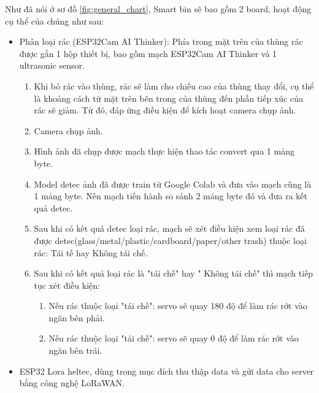 Như đã nói ở sơ đồ \ref{fig:general_chart}, Smart bin sẽ bao gồm 2 board, hoạt động cụ thể của chúng như sau:
\begin{itemize}
    \item Phân loại rác (ESP32Cam AI Thinker): Phía trong mặt trên của thùng rác được gắn 1 hộp thiết bị, bao gồm mạch ESP32Cam AI Thinker và 1 ultrasonic sensor.
    \begin{enumerate}
        \item Khi bỏ rác vào thùng, rác sẽ làm cho chiều cao của thùng thay đổi, cụ thể là khoảng cách từ mặt trên bên trong của thùng đến phần tiếp xúc của rác sẽ giảm. Từ đó, đáp ứng điều kiện để kích hoạt camera chụp ảnh.
        \item Camera chụp ảnh.
        \item Hình ảnh đã chụp được mạch thực hiện thao tác convert qua 1 mảng byte.
        \item Model detec ảnh đã được train từ Google Colab và đưa vào mạch cũng là 1 mảng byte. Nên mạch tiến hành so sánh 2 mảng byte đó và đưa ra kết quả detec.
        \item Sau khi có kết quả detec loại rác, mạch sẽ xét điều kiện xem loại rác đã được detec(glass/metal/plastic/cardboard/paper/other trash) thuộc loại rác: Tái tế hay Không tái chế.
        \item Sau khi có kết quả loại rác là "tái chế" hay " Không tái chế" thì mạch tiếp tục xét điều kiện:
        \begin{enumerate}
            \item Nếu rác thuộc loại "tái chế": servo sẽ quay 180 độ để làm rác rớt vào ngăn bên phải.
            \item Nếu rác thuộc loại "tái chế": servo sẽ quay 0 độ để làm rác rớt vào ngăn bên trái.
        \end{enumerate} 
    \end{enumerate}
    \item ESP32 Lora heltec, dùng trong mục đích thu thập data và gửi data cho server bằng công nghệ LoRaWAN.
\end{itemize}

